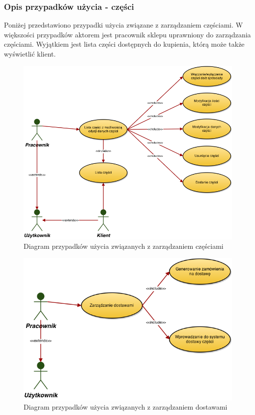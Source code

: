 \subsubsection{Opis przypadków użycia - części}

Poniżej przedstawiono przypadki użycia związane z zarządzaniem częściami. W większości przypadków aktorem jest pracownik sklepu uprawniony do zarządzania częściami. Wyjątkiem jest lista części dostępnych do kupienia, którą może także wyświetlić klient.

\begin{figure}[h!]
    \includegraphics[width=\textwidth,
    height=0.5\textheight]{graphics/UseCase/Czesci/UseCaseDiagram.png}
  \caption{Diagram przypadków użycia związanych z zarządzaniem częściami}
\end{figure}

\begin{figure}[h!]
    \includegraphics[width=\textwidth,
    height=0.5\textheight]{graphics/UseCase/Czesci/DostawyUseCase.png}
  \caption{Diagram przypadków użycia związanych z zarządzaniem dostawami}
\end{figure}


